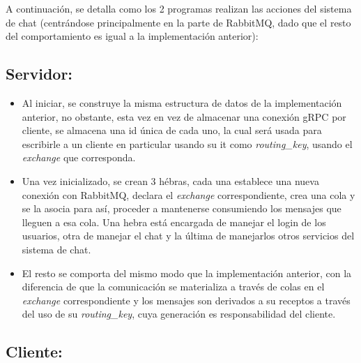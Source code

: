 \documentclass[11pt, letter]{article}
\begin{document}
A continuación, se detalla como los 2 programas realizan las acciones del sistema de chat (centrándose principalmente en la parte de RabbitMQ, dado que el resto del comportamiento es igual a la implementación anterior):

\subsection{Servidor:}

\begin{itemize}
	\item Al iniciar, se construye la misma estructura de datos de la implementación anterior, no obstante, esta vez en vez de almacenar una conexión gRPC por cliente, se almacena una id única de cada uno, la cual será usada para escribirle a un cliente en particular usando su it como \textit{routing\_key}, usando el \textit{exchange} que corresponda.
	\item Una vez inicializado, se crean 3 hébras, cada una establece una nueva conexión con RabbitMQ, declara el \textit{exchange} correspondiente, crea una cola y se la asocia para así, proceder a mantenerse consumiendo los mensajes que lleguen a esa cola. Una hebra está encargada de manejar el login de los usuarios, otra de manejar el chat y la última de manejarlos otros servicios del sistema de chat.
	\item El resto se comporta del mismo modo que la implementación anterior, con la diferencia de que la comunicación se materializa a través de colas en el \textit{exchange} correspondiente y los mensajes son derivados a su receptos a través del uso de su \textit{routing\_key}, cuya generación es responsabilidad del cliente.
\end{itemize}

\subsection{Cliente:}
\end{document}
